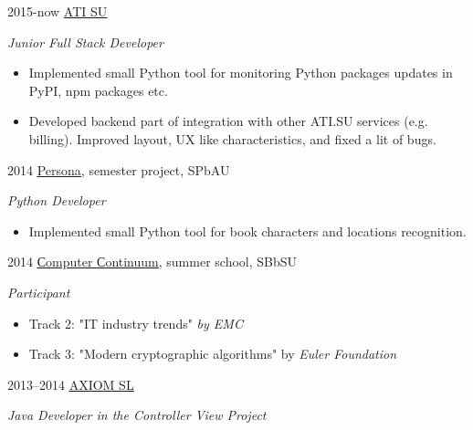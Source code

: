 \documentclass[]{friggeri-cv} %
\begin{document}
\begin{entrylist}
\entry
{2015-now}
{\href{http://http://ati.su/}{\underline{ATI SU}}}
{}
{\emph{Junior Full Stack Developer}
    \begin{itemize}
        \item
        Implemented small Python tool for monitoring Python packages updates in PyPI, npm packages etc.
        \item
        Developed backend part of integration with other ATI.SU services (e.g. billing).
        Improved layout, UX like characteristics, and fixed a lit of bugs.
    \end{itemize}
}
\entry
{2014}
{\href{https://github.com/nunberty/chars-movement-graph}{\underline{Persona}}, semester project, SPbAU}
{}
{\emph{Python Developer}
    \begin{itemize}
        \item
        Implemented small Python tool for book characters and locations recognition.
    \end{itemize}
}
\entry
{2014}
{\href{http://spbsu-school.org/}{\underline{Сomputer Сontinuum}}, summer school, SBbSU}
{}
{\emph{Participant}
    \begin{itemize}
        \item
        Track 2: "IT industry trends" \textit{by EMC}
        \item
        Track 3: "Modern cryptographic algorithms" by \textit{Euler Foundation}
    \end{itemize}
}
\entry
{2013--2014}
{\href{http://axiomsl.com}{\underline{AXIOM SL}}}
{}
{\emph{Java Developer in the Controller View Project}

}
\end{entrylist}
\end{document}
